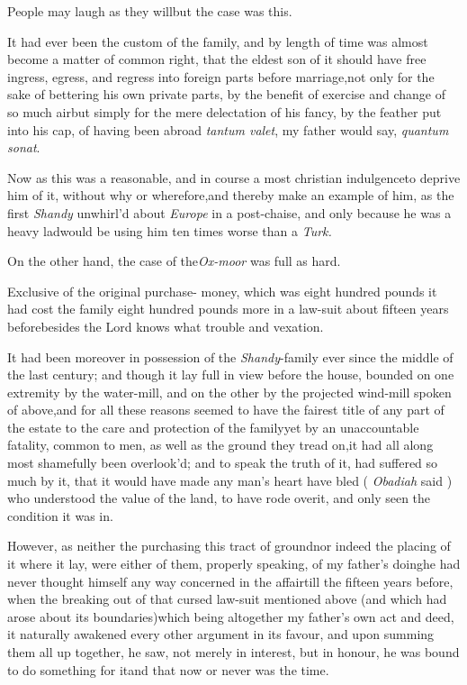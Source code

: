 \documentclass{article}
\begin{document}
\tsk People may laugh as they will\tsh but the case
was this.

It had ever been the custom of the family, and by length of time
was almost become a matter of common right, that the eldest son of
it should have free ingress, egress, and regress into foreign parts
before marriage,\tsk not only for the sake of bettering his own
private parts, by the benefit of exercise and change of so much
air\tsk but simply for the mere delectation of his fancy, by the
feather\pb
put into his cap, of having been abroad\break
\tsk \textit{tantum valet}, my father would say,
\textit{quantum sonat}.

Now as this was a reasonable, and in course a most christian
indulgence\tsh to deprive him of it, without why or\break
wherefore,\tsh and thereby make an example of him, as the
first \textit{Shandy} unwhirl’d about \textit{Europe} in a
post-chaise, and only because he was a heavy lad\tsh would
be using him ten times worse than a \textit{Turk.}

On the other hand, the case of the\break \textit{Ox-moor} was full as
hard.

Exclusive of the original purchase-\break
money, which was eight hundred pounds\break
\tsk it had cost the family eight hundred
pounds more in a law-suit about fifteen\pb
years before\tsk besides the Lord knows what trouble and vexation.

It had been moreover in possession of the \textit{Shandy}-family
ever since the middle of the last century; and though it lay full
in view before the house, bounded on one extremity by the
water-mill, and on the other by the projected wind-mill
spoken of above,\tsk and for all these reasons
seemed to have the fairest title of any part of the estate to the
care and protection of the family\tsk yet by an unaccountable
fatality, common to men, as well as the ground they tread
on,\tsk it had all along most shamefully been
overlook’d; and to speak the truth of it, had suffered so
much by it, that it would have made any man’s heart have bled
( \textit{Obadiah} said ) who understood the value of the land, to have
rode over\pb it, and only seen the condition it was in.

However, as neither the purchasing this tract of
ground\tsk nor indeed the placing of it where it lay, were either
of them, properly speaking, of my father’s
doing\tsh he had never thought himself any way concerned
in the affair\tsh till the fifteen years before, when the
breaking out of that cursed law-suit mentioned above (and which had
arose about its boundaries)\tsh which being altogether my
father’s own act and deed, it naturally awakened every other
argument in its favour, and upon summing them all up
together, he saw, not merely in interest, but in honour, he was
bound to do something for it\tsh and that now or never was
the time.
\end{document}
